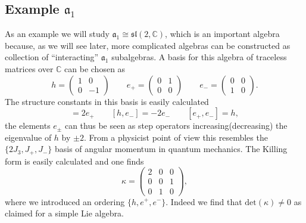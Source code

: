 \subsection{Example $\mathfrak{a}_1$}
As an example we will study $\mathfrak{a}_1\cong\mathfrak{sl}(2,\mathbb{C})$, which is an important algebra because, as we will see later, more complicated algebras can be constructed as collection of ``interacting'' $\mathfrak{a}_1$ subalgebras. A basis for this algebra of traceless matrices over $\mathbb{C}$ can be chosen as 
\begin{equation}
    h=\begin{pmatrix}1&0\\0 &-1\end{pmatrix}\qquad e_+=\begin{pmatrix}0&1\\0 &0\end{pmatrix}\qquad e_-=\begin{pmatrix}0&0\\1 &0\end{pmatrix}.
\end{equation}
The structure constants in this basis is easily calculated 
\begin{equation}
    [h,e_+] = 2e_+\qquad [h,e_-]=-2e_- \qquad [e_+,e_-]=h,
\end{equation}
the elements $e_{\pm}$ can thus be seen as step operators increasing(decreasing) the eigenvalue of $h$ by $\pm 2$. From a physicist point of view this resembles the $\{2J_3,J_+,J_-\}$ basis of angular momentum in quantum mechanics. The Killing form is easily calculated and one finds 
\begin{equation}
    \kappa = \begin{pmatrix}2&0&0\\0&0&1\\0&1&0\end{pmatrix},
\end{equation}
where we introduced an ordering $\{h,e^+,e^-\}$. Indeed we find that $\text{det}(\kappa)\neq 0$ as claimed for a simple Lie algebra.


